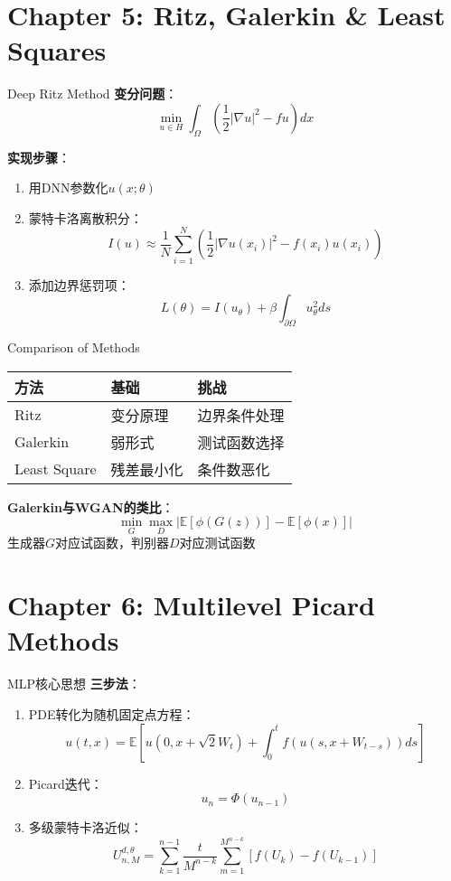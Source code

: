 \documentclass[aspectratio=169]{beamer}
\begin{document}
	\section{Chapter 5: Ritz, Galerkin \& Least Squares}
	\begin{frame}{Deep Ritz Method}
		\textbf{变分问题}：
		\[
		\min_{u \in H} \int_\Omega \left( \frac{1}{2}|\nabla u|^2 - fu \right) dx
		\]

		\textbf{实现步骤}：
		\begin{enumerate}
			\item 用DNN参数化$u(x;\theta)$
			\item 蒙特卡洛离散积分：
			\[
			I(u) \approx \frac{1}{N}\sum_{i=1}^N \left( \frac{1}{2}|\nabla u(x_i)|^2 - f(x_i)u(x_i) \right)
			\]
			\item 添加边界惩罚项：
			\[
			L(\theta) = I(u_\theta) + \beta \int_{\partial\Omega} u_\theta^2 ds
			\]
		\end{enumerate}
	\end{frame}

	\begin{frame}{Comparison of Methods}
		\begin{table}[ht]
		\centering
		\begin{tabular}{|l|l|l|}
		\hline
		\textbf{方法} & \textbf{基础} & \textbf{挑战} \\
		\hline
		Ritz & 变分原理 & 边界条件处理 \\
		Galerkin & 弱形式 & 测试函数选择 \\
		Least Square & 残差最小化 & 条件数恶化 \\
		\hline
		\end{tabular}
		\end{table}

		\textbf{Galerkin与WGAN的类比}：
		\[
		\min_G \max_D \left| \mathbb{E}[\phi(G(z))] - \mathbb{E}[\phi(x)] \right|
		\]
		生成器$G$对应试函数，判别器$D$对应测试函数
	\end{frame}

	\section{Chapter 6: Multilevel Picard Methods}
	\begin{frame}{MLP核心思想}
		\textbf{三步法}：
		\begin{enumerate}
			\item PDE转化为随机固定点方程：
			\[
			u(t,x) = \mathbb{E}\left[ u(0,x+\sqrt{2}W_t) + \int_0^t f(u(s,x+W_{t-s}))ds \right]
			\]
			\item Picard迭代：
			\[
			u_{n} = \Phi(u_{n-1})
			\]
			\item 多级蒙特卡洛近似：
			\[
			U_{n,M}^{d,\theta} = \sum_{k=1}^{n-1} \frac{t}{M^{n-k}} \sum_{m=1}^{M^{n-k}} [f(U_k) - f(U_{k-1})] 
			\]
		\end{enumerate}
	\end{frame}
\end{document}
